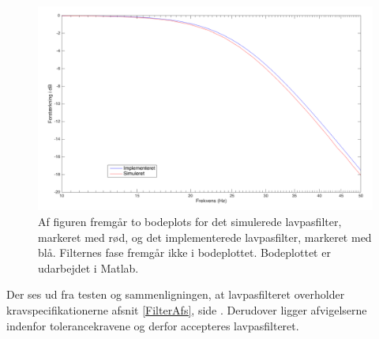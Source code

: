 \begin{figure}[H]
	\centering
	\includegraphics[scale=0.4]{figures/cProblemloesning/sammenligning_sim_imp.PNG}
	\caption{Af figuren fremgår to bodeplots for det simulerede lavpasfilter, markeret med rød, og det implementerede lavpasfilter, markeret med blå. Filternes fase fremgår ikke i bodeplottet. Bodeplottet er udarbejdet i Matlab.}
	\label{fig:sammenligning_sim_imp}
\end{figure} 

Der ses ud fra testen og sammenligningen, at lavpasfilteret overholder kravspecifikationerne afsnit \ref{FilterAfs}, side \pageref{FilterAfs}. Derudover ligger afvigelserne indenfor tolerancekravene og derfor accepteres lavpasfilteret. 